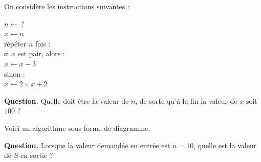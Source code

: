 \documentclass[class=report,crop=false, 12pt]{standalone}
\begin{document}
\begin{enigme}[Si ... alors ...]

On considère les instructions suivantes :

\begin{center}
\begin{minipage}{0.3\textwidth}
$n \leftarrow \ ?$ \\
$x \leftarrow n$ \\
répéter $n$ fois : \\
\indentation si $x$ est pair, alors : \\ 
\indentation\indentation $x \leftarrow x - 3$ \\
\indentation sinon : \\
\indentation\indentation $x \leftarrow 2\times x + 2$
\end{minipage}
\end{center}

\bigskip

\textbf{Question.} Quelle doit être la valeur de $n$, de sorte qu'à la fin la valeur de $x$ soit $100$ ?


\end{enigme}





\begin{enigme}[Boucles I]

Voici un algorithme sous forme de diagramme.
 
\bigskip

\textbf{Question.} Lorsque la valeur demandée en entrée est $n=10$, quelle est la valeur de $S$ en sortie ?


\end{enigme}
\end{document}
